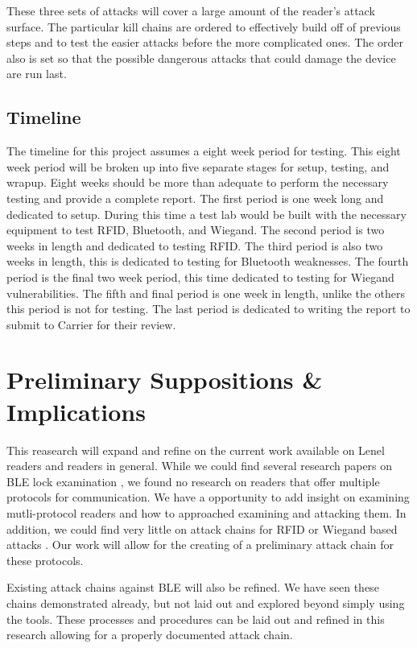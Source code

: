 \documentclass[10pt,twocolumn,letterpaper]{article}
\begin{document}
These three sets of attacks will cover a large amount of the reader's attack surface.  The particular kill chains are ordered to effectively build off of previous steps and to test the easier attacks before the more complicated ones.  The order also is set so that the possible dangerous attacks that could damage the device are run last.

\subsection{Timeline}
The timeline for this project assumes a eight week period for testing.  This eight week period will be broken up into five separate stages for setup, testing, and wrapup.  Eight weeks should be more than adequate to perform the necessary testing and provide a complete report.  The first period is one week long and dedicated to setup.  During this time a test lab would be built with the necessary equipment to test RFID, Bluetooth, and Wiegand.  The second period is two weeks in length and dedicated to testing RFID.  The third period is also two weeks in length, this is dedicated to testing for Bluetooth weaknesses.  The fourth period is the final two week period, this time dedicated to testing for Wiegand vulnerabilities.  The fifth and final period is one week in length, unlike the others this period is not for testing.  The last period is dedicated to writing the report to submit to Carrier for their review.

\section{Preliminary Suppositions \& Implications}
This reasearch will expand and refine on the current work available on Lenel readers and readers in general. While we could find several research papers on BLE lock examination \cite{matthewrs2017surveydoorlock}\cite{ho2016smart}\cite{ye2017security}\cite{8887393}, we found no research on readers that offer multiple protocols for communication. We have a opportunity to add insight on examining mutli-protocol readers and how to approached examining and attacking them. In addition, we could find very little on attack chains for RFID or Wiegand based attacks \cite{chung2017wiegand}. Our work will allow for the creating of a preliminary attack chain for these protocols. 

Existing attack chains against BLE will also be refined. We have seen these chains demonstrated \cite{lonzetta2018security}\cite{BluetoothMITMTal} already, but not laid out and explored beyond simply using the tools. These processes and procedures can be laid out and refined in this research allowing for a properly documented attack chain. 
\end{document}
